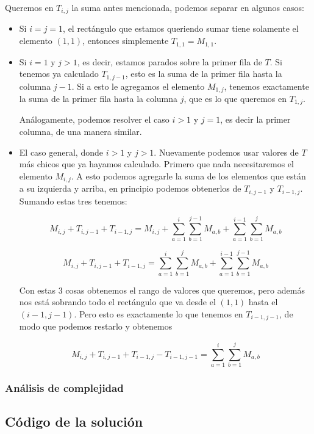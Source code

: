 Queremos en $T_{i,j}$ la suma antes mencionada, podemos separar en algunos casos: 
\begin{itemize}
\item Si $i = j = 1$, el rectángulo que estamos queriendo sumar tiene solamente el 
elemento $(1,1)$, entonces simplemente $T_{1,1} = M_{1,1}$. 

\item Si $i = 1$ y $j > 1$, es decir, estamos parados sobre la primer fila de $T$. 
Si tenemos ya calculado $T_{1,j-1}$, esto es la suma de la primer fila hasta la 
columna $j-1$. Si a esto le agregamos el elemento $M_{1,j}$, tenemos exactamente la 
suma de la primer fila hasta la columna $j$, que es lo que queremos en $T_{1,j}$. 

Análogamente, podemos resolver el caso $i > 1$ y $j = 1$, es decir la primer columna, 
de una manera similar. 

\item El caso general, donde $i > 1$ y $j > 1$. Nuevamente podemos usar valores de $T$ más 
chicos que ya hayamos calculado. Primero que nada necesitaremos el elemento $M_{i,j}$. 
A esto podemos agregarle la suma de los elementos que están a su izquierda y arriba, 
en principio podemos obtenerlos de $T_{i,j-1}$ y $T_{i-1,j}$. Sumando estas tres tenemos: 

\begin{equation}
M_{i,j} + T_{i,j-1} + T_{i-1,j} = M_{i,j} + \sum\limits_{a = 1}^{i} \sum\limits_{b = 1}^{j-1} M_{a,b} + \sum\limits_{a = 1}^{i-1} \sum\limits_{b = 1}^{j} M_{a,b}
\end{equation}


\begin{equation}
M_{i,j} + T_{i,j-1} + T_{i-1,j} = \sum\limits_{a = 1}^{i} \sum\limits_{b = 1}^{j} M_{a,b} + \sum\limits_{a = 1}^{i-1} \sum\limits_{b = 1}^{j-1} M_{a,b}
\end{equation}

Con estas 3 cosas obtenemos el rango de valores que queremos, pero además nos está sobrando 
todo el rectángulo que va desde el $(1,1)$ hasta el $(i-1,j-1)$. Pero esto es exactamente lo 
que tenemos en $T_{i-1,j-1}$, de modo que podemos restarlo y obtenemos 

\begin{equation}
M_{i,j} + T_{i,j-1} + T_{i-1,j} - T_{i-1,j-1} = \sum\limits_{a = 1}^{i} \sum\limits_{b = 1}^{j} M_{a,b}
\end{equation}

\end{itemize}

\subsubsection*{Análisis de complejidad}

\newpage
\subsection{Código de la solución}

